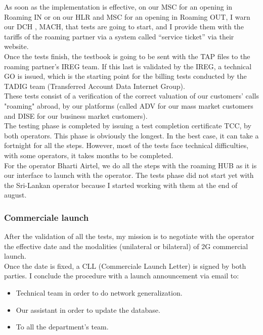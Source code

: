 As soon as the implementation is effective, on our \acs{MSC} for an opening in Roaming IN or on our \acs{HLR} and \acs{MSC} for an opening in Roaming OUT, I warn our \acs{DCH} , MACH, that tests are going to start, and I provide them with the tariffs of the roaming partner via a system called “service ticket” via their website.\\

Once the tests finish, the testbook is going to be sent with the \acs{TAP} files to the roaming partner’s \acs{IREG} team. If this last is validated by the IREG, a technical GO is issued, which is the starting point for the billing tests conducted by the \acs{TADIG} team (Transferred Account Data Internet Group).\\

These tests consist of a verification of the correct valuation of our customers’ calls "roaming" abroad, by our platforms (called \acs{ADV} for our mass market customers and \acs{DISE} for our business market customers).\\

The testing phase is completed by issuing a test completion certificate \acs{TCC}, by both operators. This phase is obviously the longest. In the best case, it can take a fortnight for all the steps. However, most of the tests face technical difficulties, with some operators, it takes months to be completed.\\

For the operator Bharti Airtel, we do all the steps with the roaming HUB as it is our interface to launch with the operator. The tests phase did not start yet with the Sri-Lankan operator because I started working with them at the end of august.\\

\subsubsection{Commerciale launch}
\-\hspace{0.5cm} After the validation of all the tests, my mission is to negotiate with the operator the effective date and the modalities (unilateral or bilateral) of \acs{2G} commercial launch.\\

Once the date is fixed, a \acs{CLL} (Commerciale Launch Letter) is signed by both parties. I conclude the procedure with a launch announcement via email to:
\begin{itemize}
    \setlength\itemsep{0.2em}
    \item Technical team in order to do network generalization.
    \item Our assistant in order to update the database.
    \item To all the department’s team.
\end{itemize}

